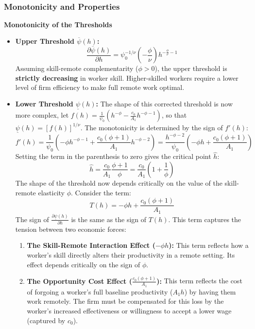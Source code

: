 \documentclass[
  11pt,
  letterpaper,
  DIV=11,
  numbers=noendperiod]{scrartcl}
\providecommand{\tightlist}{%
  \setlength{\itemsep}{0pt}\setlength{\parskip}{0pt}}\usepackage{longtable,booktabs,array}
\begin{document}
\subsubsection{Monotonicity and
Properties}\label{monotonicity-and-properties}

\textbf{Monotonicity of the Thresholds}

\begin{itemize}
\item
  \textbf{Upper Threshold \(\overline{\psi}(h)\):} \[
  \frac{\partial \overline{\psi}(h)}{\partial h} = \psi_0^{-1/\nu} \left(-\frac{\phi}{\nu}\right) h^{-\frac{\phi}{\nu}-1}
  \] Assuming skill-remote complementarity (\(\phi > 0\)), the upper
  threshold is \textbf{strictly decreasing} in worker skill.
  Higher-skilled workers require a lower level of firm efficiency to
  make full remote work optimal.
\item
  \textbf{Lower Threshold \(\underline{\psi}(h)\):} The shape of this
  corrected threshold is now more complex, let
  \(f(h) = \frac{1}{\psi_0} \left( h^{-\phi} - \frac{c_0}{A_1}h^{-\phi-1} \right)\),
  so that \(\underline{\psi}(h) = [f(h)]^{1/\nu}\). The monotonicity is
  determined by the sign of \(f'(h)\): \[
  f'(h) = \frac{1}{\psi_0} \left( -\phi h^{-\phi-1} + \frac{c_0(\phi+1)}{A_1}h^{-\phi-2} \right) = \frac{h^{-\phi-2}}{\psi_0} \left( -\phi h + \frac{c_0(\phi+1)}{A_1} \right)
  \] Setting the term in the parenthesis to zero gives the critical
  point \(\hat{h}\): \[
  \hat{h} = \frac{c_0}{A_1} \frac{\phi+1}{\phi} = \frac{c_0}{A_1} \left(1 + \frac{1}{\phi}\right)
  \] The shape of the threshold now depends critically on the value of
  the skill-remote elasticity \(\phi\). Consider the term: \[
  T(h) = -\phi h + \frac{c_0(\phi+1)}{A_1}
  \] The sign of \(\frac{\partial\underline{\psi}(h)}{\partial h}\) is
  the same as the sign of \(T(h)\). This term captures the tension
  between two economic forces:

  \begin{enumerate}
  \def\labelenumi{\arabic{enumi}.}
  \tightlist
  \item
    \textbf{The Skill-Remote Interaction Effect (\(-\phi h\)):} This
    term reflects how a worker's skill directly alters their
    productivity in a remote setting. Its effect depends critically on
    the sign of \(\phi\).
  \item
    \textbf{The Opportunity Cost Effect (\(\frac{c_0(\phi+1)}{A_1}\)):}
    This term reflects the cost of forgoing a worker's full baseline
    productivity (\(A_1 h\)) by having them work remotely. The firm must
    be compensated for this loss by the worker's increased effectiveness
    or willingness to accept a lower wage (captured by \(c_0\)).
  \end{enumerate}


\end{itemize}
\end{document}
